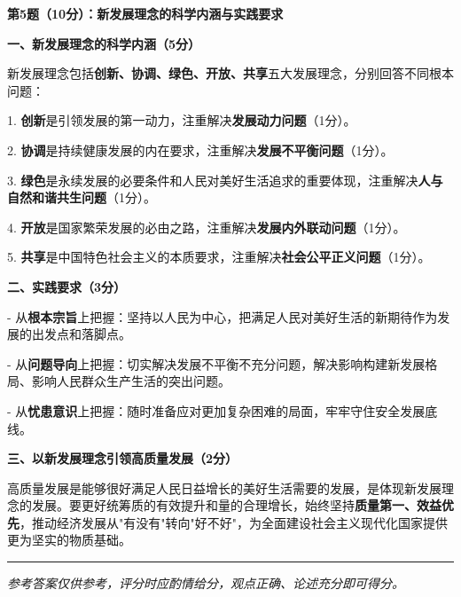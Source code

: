 \documentclass[12pt, a4paper]{article}
\newcommand{\examrule}{\noindent\rule{\linewidth}{0.6pt}}
\begin{document}
\begin{answerbox}

\textbf{第5题（10分）：新发展理念的科学内涵与实践要求}

\textbf{一、新发展理念的科学内涵（5分）}

新发展理念包括\textbf{创新、协调、绿色、开放、共享}五大发展理念，分别回答不同根本问题：

1. \textbf{创新}是引领发展的第一动力，注重解决\textbf{发展动力问题}（1分）。

2. \textbf{协调}是持续健康发展的内在要求，注重解决\textbf{发展不平衡问题}（1分）。

3. \textbf{绿色}是永续发展的必要条件和人民对美好生活追求的重要体现，注重解决\textbf{人与自然和谐共生问题}（1分）。

4. \textbf{开放}是国家繁荣发展的必由之路，注重解决\textbf{发展内外联动问题}（1分）。

5. \textbf{共享}是中国特色社会主义的本质要求，注重解决\textbf{社会公平正义问题}（1分）。

\textbf{二、实践要求（3分）}

- 从\textbf{根本宗旨}上把握：坚持以人民为中心，把满足人民对美好生活的新期待作为发展的出发点和落脚点。

- 从\textbf{问题导向}上把握：切实解决发展不平衡不充分问题，解决影响构建新发展格局、影响人民群众生产生活的突出问题。

- 从\textbf{忧患意识}上把握：随时准备应对更加复杂困难的局面，牢牢守住安全发展底线。

\textbf{三、以新发展理念引领高质量发展（2分）}

高质量发展是能够很好满足人民日益增长的美好生活需要的发展，是体现新发展理念的发展。要更好统筹质的有效提升和量的合理增长，始终坚持\textbf{质量第一、效益优先}，推动经济发展从"有没有"转向"好不好"，为全面建设社会主义现代化国家提供更为坚实的物质基础。

\end{answerbox}

\vspace{12pt}
\examrule
\begin{center}
  \textit{参考答案仅供参考，评分时应酌情给分，观点正确、论述充分即可得分。}
\end{center}
\end{document}
